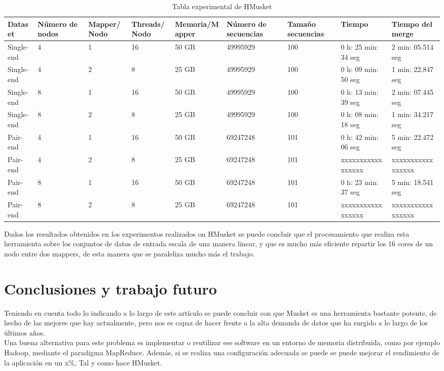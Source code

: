 \documentclass[conference]{IEEEtran}
\begin{document}
\begin{table}[]
	\label{hmusket_experiment_result}
	\begin{tabular}{|p{1.3cm}|p{1cm}|l|l|l|p{1.5cm}|p{1.5cm}|p{2.2cm}|p{2.2cm}|}
		\hline
		\textbf{Dataset} &	\textbf{Número de nodos} & \textbf{Mapper/Nodo} & \textbf{Threads/Nodo} & \textbf{Memoria/Mapper} & \textbf{Número de secuencias} & \textbf{Tamaño secuencias} & \textbf{Tiempo} & \textbf{Tiempo del merge}	\\ \hline
		Single-end &	4 & 1 & 16 & 50 GB & 49995929 & 100 & 0 h: 25 min: 34 seg	& 2 min: 05.514 seg	\\ \hline
		Single-end &	4 & 2 & 8 & 25 GB & 49995929 & 100 & 0 h: 09 min: 50 seg	& 1 min: 22.847 seg	\\ \hline
		Single-end &	8 & 1 & 16 & 50 GB & 49995929 & 100 & 0 h: 13 min: 39 seg	& 2 min: 07.445 seg	\\ \hline
		Single-end &	8 & 2 & 8 & 25 GB & 49995929 & 100 & 0 h: 08 min: 18 seg	& 1 min: 34.217 seg	\\ \hline \hline
		Pair-end &	4 & 1 & 16 & 50 GB & 69247248 & 101 & 0 h: 42 min: 06 seg	& 5 min: 22.472 seg	\\ \hline
		Pair-end &	4 & 2 & 8 & 25 GB & 69247248 & 101 & xxxxxxxxxxxxxxxxx	& xxxxxxxxxxxxxxxxx	\\ \hline
		Pair-end &	8 & 1 & 16 & 50 GB & 69247248 & 101 & 0 h: 23 min: 37 seg	& 5 min: 18.541 seg	\\ \hline
		Pair-end &	8 & 2 & 8 & 25 GB & 69247248 & 101 & xxxxxxxxxxxxxxxxx	& xxxxxxxxxxxxxxxxx \\ \hline
	\end{tabular}
	\caption{Tabla experimental de HMusket}
\end{table}

Dados los resultados obtenidos en los experimentos realizados on HMusket se puede concluir que el procesamiento que realiza esta herramienta sobre los conjuntos de datos de entrada escala de una manera linear, y que es mucho más eficiente repartir los 16 cores de un nodo entre dos mappers, de esta manera que se paraleliza mucho más el trabajo.\\

\section{Conclusiones y trabajo futuro}
Teniendo en cuenta todo lo indicando a lo largo de este artículo se puede concluir con que Musket es una herramienta bastante potente, de hecho de las mejores que hay actualmente, pero nos es capaz de hacer frente a la alta demanda de datos que ha surgido a lo largo de los últimos años.\\
Una buena alternativa para este problema es implementar o reutilizar ese software en un entorno de memoria distribuida, como por ejemplo Hadoop, mediante el paradigma MapReduce. Además, si se realiza una configuración adecuada se puede se puede mejorar el rendimiento de la aplicación en un x\%, Tal y como hace HMusket.\\
\end{document}
